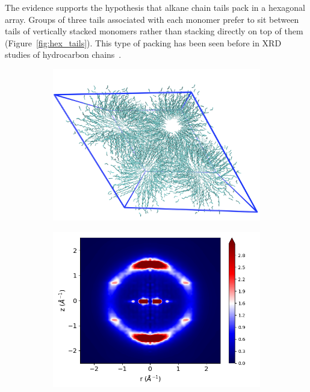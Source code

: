 \documentclass[journal=jpcbfk,manusciprt=article]{achemso}
\begin{document}
  The evidence supports the hypothesis that alkane chain tails pack in a
  hexagonal array. Groups of three tails associated with each monomer prefer to
  sit between tails of vertically stacked monomers rather than stacking directly
  on top of them (Figure~\ref{fig:hex_tails}). This type of packing has been seen
  before in XRD studies of hydrocarbon chains~\cite{small_lateral_1984}.

  \begin{figure}
	\centering
	\begin{subfigure}{0.45\linewidth}
		\centering
	 	\vspace{-2em}
		\includegraphics[width=\textwidth]{tails_topview.png}  %
		\caption{}\label{fig:topdown_tails_only}
	\end{subfigure}
	\begin{subfigure}{0.45\linewidth}
		\centering
		\includegraphics[width=\textwidth]{tails_rzplot.png}

\end{subfigure}
\end{figure}
\end{document}
